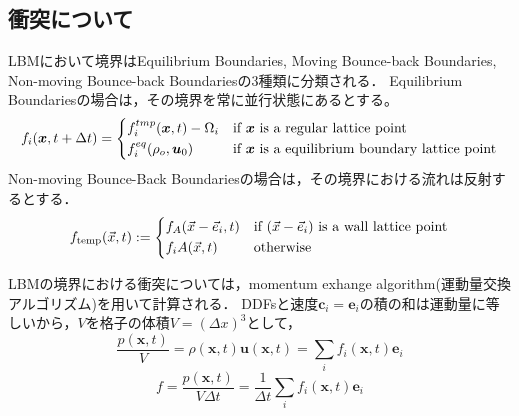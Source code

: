 \subsection{衝突について}
LBMにおいて境界はEquilibrium Boundaries, Moving Bounce-back Boundaries, Non-moving Bounce-back Boundariesの3種類に分類される．
Equilibrium Boundariesの場合は，その境界を常に並行状態にあるとする。
\begin{equation}
    f_i(\bm{x}, t+\Delta t) =
    \begin{dcases}
        f^{tmp}_{i}(\bm{x}, t) - \Omega_i & \text{if $\bm{x}$ is a regular lattice point} \\
        f^{eq}_{i}(\rho_o, \bm{u}_0)            & \text{if $\bm{x}$ is a equilibrium boundary lattice point}
    \end{dcases}
\end{equation}
Non-moving Bounce-Back Boundariesの場合は，その境界における流れは反射するとする．
\begin{equation}
  f_{\text{temp}}(\vec{x}, t) := 
\begin{dcases}
    f_A(\vec{x} - \vec{e}_i, t) & \text{if } (\vec{x} - \vec{e}_i) \text{ is a wall lattice point} \\
    f_iA(\vec{x}, t) & \text{otherwise}
\end{dcases}
\end{equation}

LBMの境界における衝突については，momentum exhange algorithm(運動量交換アルゴリズム)を用いて計算される．
DDFsと速度$\bm{c}_i=\bm{e}_i$の積の和は運動量に等しいから，$V$を格子の体積$V=(\Delta x)^3$として，
\begin{equation}\label{eq:momentum-exchange}
    \frac{p(\bm{x}, t)}{V} = \rho(\bm{x}, t) \bm{u}(\bm{x}, t) = \sum_i f_i(\bm{x}, t) \bm{e}_i
\end{equation}
\begin{equation}\label{eq:force}
    f = \frac{p(\bm{x}, t)}{V \Delta t} = \frac{1}{\Delta t} \sum_i f_i(\bm{x}, t) \bm{e}_i
\end{equation}